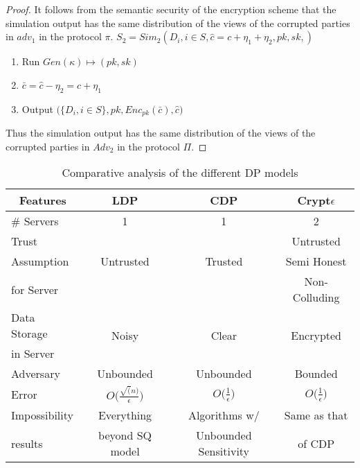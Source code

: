 \begin{proof}
It follows from the semantic security of the encryption scheme that the simulation
output has the same distribution of the views of the corrupted parties in $adv_1$ in the
protocol $\pi$.
$S_2=Sim_2(D_i, i \in S, \hat{c}=c+\eta_1+\eta_2,pk,sk,)$
\begin{enumerate}\item Run $Gen(\kappa)\mapsto (pk,sk)$ \item $\bar{c}=\hat{c}-\eta_2=c+\eta_1$
\item Output $\Big(\{D_i, i \in S\},pk,Enc_{pk}(\bar{c}),\hat{c} \Big)$
\end{enumerate}
Thus the simulation output has the same distribution of the
views of the corrupted parties in $Adv_2$ in the protocol $\Pi$. 


\end{proof}
\begin{table}[h!]
\small
\centering
\caption {Comparative analysis of the different DP models}
 \begin{tabular}{|l| c c c|}  \toprule
\multicolumn{1}{|c}{\textbf{Features}} & \textbf{LDP}  & \textbf{CDP}  & \textbf{Crypt$\epsilon$}  \\ [0.5ex] 
 \hline \hline\# Servers & 1& 1 & 2\\\hline
Trust  & & & Untrusted \\  Assumption & Untrusted & Trusted & Semi Honest \\for Server &  &   &  Non-Colluding  \\ \hline
Data Storage & \multirow{2}{*}{Noisy} & \multirow{2}{*}{Clear} & \multirow{2}{*}{Encrypted} \\in Server & &  &  \\\hline
Adversary & Unbounded & Unbounded & Bounded \\\hline
 Error & $O\Big(\frac{\sqrt(n)}{\epsilon}\Big)$& $O\Big(\frac{1}{\epsilon}\Big)$ & $O\Big(\frac{1}{\epsilon}\Big)$\\\hline
 Impossibility & Everything & Algorithms w/ & Same as that \\results & beyond SQ model & Unbounded Sensitivity & of \textsf{CDP}\footnotemark\\
  [1ex] 
 \bottomrule
 \end{tabular}\label{DPCompare}
\end{table}

